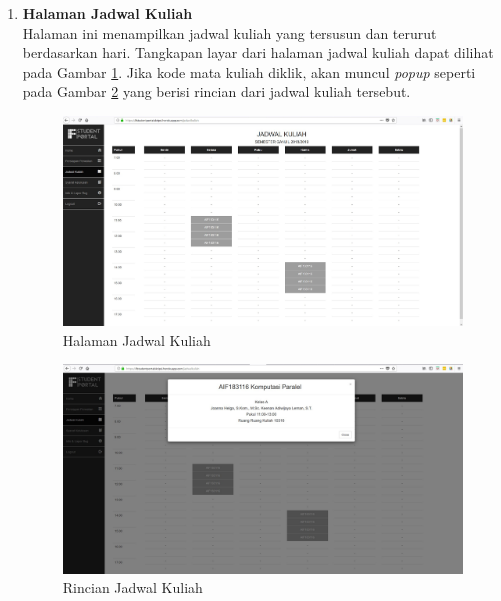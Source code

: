 \begin{enumerate}
				\item\textbf{Halaman Jadwal Kuliah}\\
				Halaman ini menampilkan jadwal kuliah yang tersusun dan terurut berdasarkan hari. Tangkapan layar dari halaman jadwal kuliah dapat dilihat pada Gambar \ref{fig:5_halaman_jadwal}. Jika kode mata kuliah diklik, akan muncul \textit{popup} seperti pada Gambar \ref{fig:5_halaman_jadwal_rinci} yang berisi rincian dari jadwal kuliah tersebut.
				\begin{figure}[H]
						\centering
						\includegraphics[scale=0.34]{Gambar/halaman_jadwal}
						\caption{Halaman Jadwal Kuliah} 
						\label{fig:5_halaman_jadwal}
					\end{figure}
					
					\begin{figure}[H]
						\centering
						\includegraphics[scale=0.34]{Gambar/halaman_jadwal_rinci}
						\caption{Rincian Jadwal Kuliah} 
						\label{fig:5_halaman_jadwal_rinci}
					\end{figure}
					

\end{enumerate}

